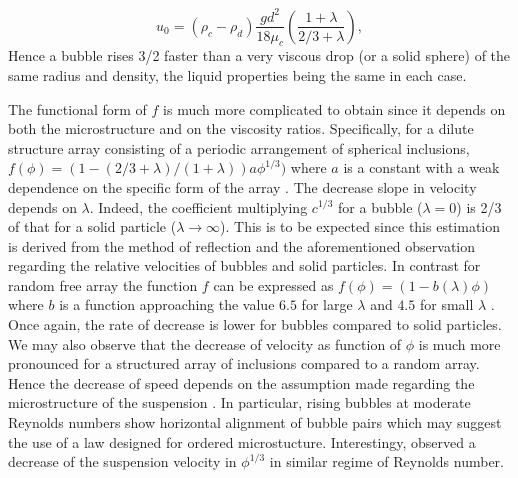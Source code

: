 

\begin{equation}
    u_0
    = (\rho_c - \rho_d)\frac{g d^2}{18\mu_c}\left(\frac{1+\lambda}{2/3 + \lambda}\right),
    \label{eq:u_o}
\end{equation}
Hence a bubble rises 3/2 faster than a very viscous drop (or a solid sphere) of the same radius and density, the liquid properties being the same in each case.

The functional form of $f$ is much more complicated to obtain since it depends on both the microstructure and on the viscosity ratios. Specifically, for a dilute structure array consisting of a periodic arrangement of spherical inclusions, $f(\phi) =(1 - (2/3+\lambda)/(1+\lambda))a\phi^{1/3})$ where $a$ is a constant with a weak dependence on the specific form of the array \citep{sangani1987}. The decrease slope in velocity depends on $\lambda$. Indeed, the coefficient multiplying $c^{1/3}$ for a bubble ($\lambda=0$) is 2/3 of that for a solid particle ($\lambda \to \infty$). This is to be expected since this estimation is derived from the method of reflection and the aforementioned observation regarding the relative velocities of bubbles and solid particles. In contrast for random free array the function $f$ can be expressed as  $f(\phi) = (1-b(\lambda)\phi)$ where $b$ is a function approaching the value $6.5$ for large $\lambda$ and $4.5$ for small $\lambda$ \citep{wacholder1973,haber1981}. Once again, the rate of decrease is lower for bubbles compared to solid particles. We may also observe that the decrease of velocity as function of $\phi$ is much more pronounced for a structured array of inclusions compared to a random array. Hence the decrease of speed depends on the assumption made regarding the microstructure of the suspension \citep{davis1985}. In particular, rising bubbles at moderate Reynolds numbers show horizontal alignment of bubble pairs \citep{bunner2002,yin2006} which may suggest the use of a law designed for ordered microstucture. Interestingy, \citet{loisy2017} observed a decrease of the suspension velocity in $\phi^{1/3}$ in similar regime of Reynolds number. 


